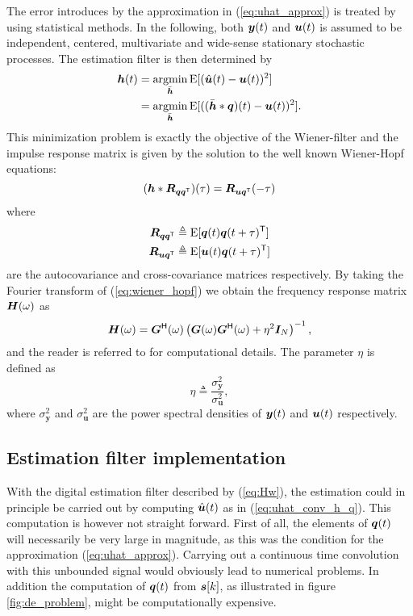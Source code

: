 The error introduces by the approximation in (\ref{eq:uhat_approx}) is treated by using statistical methods. In the following, both $\bm{y}(t)$ and $\bm{u}(t)$ is assumed to be independent, centered, multivariate and wide-sense stationary stochastic processes. The estimation filter is then determined by
\begin{align}
    \bm{h}(t)    & = \operatorname*{argmin}_{\bar{\bm{h}}} \text{E}[(\hat{\bm{u}}(t) - \bm{u}(t))^2] \\
            & = \operatorname*{argmin}_{\bar{\bm{h}}} \text{E}[((\bar{\bm{h}}*\bm{q})(t) - \bm{u}(t))^2].
\end{align}
This minimization problem is exactly the objective of the Wiener-filter \cite{optimal_filtering} and the impulse response matrix is given by the solution to the well known Wiener-Hopf equations:
\begin{equation}
    \label{eq:wiener_hopf}
    (\bm{h}* \bm{R}_{\bm{q}\bm{q}^\mathsf{T}})(\tau) = \bm{R}_{\bm{u}\bm{q}^\mathsf{T}}(-\tau)
\end{equation}
where
\begin{align}
    \bm{R}_{\bm{q}\bm{q}^\mathsf{T}} & \triangleq \text{E}[\bm{q}(t)\bm{q}(t+\tau)^\mathsf{T}] \\
    \bm{R}_{\bm{u}\bm{q}^\mathsf{T}} & \triangleq \text{E}[\bm{u}(t)\bm{q}(t+\tau)^\mathsf{T}]
\end{align}
are the autocovariance and cross-covariance matrices respectively. By taking the Fourier transform of (\ref{eq:wiener_hopf}) we obtain the frequency response matrix $\bm{H}(\omega)$ as
\begin{equation}
    \label{eq:Hw}
    \bm{H}(\omega) = \bm{G}^\mathsf{H}(\omega) \left( \bm{G}(\omega)\bm{G}^\mathsf{H}(\omega) + \eta^2\bm{I}_N \right)^{-1},
\end{equation}
and the reader is referred to \cite{malmberg_thesis} for computational details.
The parameter $\eta$ is defined as
\begin{equation}
    \label{eq:def_eta}
    \eta \triangleq \frac{\sigma_{\bm{y}}^2}{\sigma_{\bm{u}}^2},
\end{equation}
where $\sigma_{\bm{y}}^2$ and $\sigma_{\bm{u}}^2$ are the power spectral densities of $\bm{y}(t)$ and $\bm{u}(t)$ respectively.




\subsection{Estimation filter implementation}
With the digital estimation filter described by (\ref{eq:Hw}), the estimation could in principle be carried out by computing $\hat{\bm{u}}(t)$ as in (\ref{eq:uhat_conv_h_q}). This computation is however not straight forward. First of all, the elements of $\bm{q}(t)$ will necessarily be very large in magnitude, as this was the condition for the approximation (\ref{eq:uhat_approx}). Carrying out a continuous time convolution with this unbounded signal would obviously lead to numerical problems. In addition the computation of $\bm{q}(t)$ from $\bm{s}[k]$, as illustrated in figure \ref{fig:de_problem}, might be computationally expensive.

